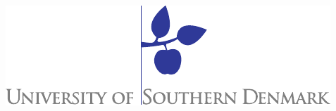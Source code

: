 \begin{titlepage}%
\begin{flushright}
\includegraphics[scale=0.73]{content/00_frontmatter/sdu_logo.pdf}
\end{flushright}
\vspace*{2.7cm}
%
%
\setlength{\extrarowheight}{1.5pt}
\begin{tabular}{@{}l l}

\end{tabular}
\end{titlepage}
